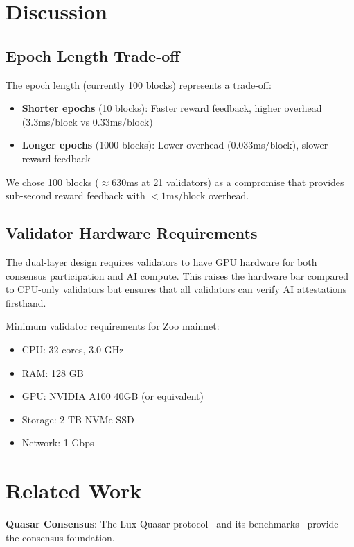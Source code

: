 \documentclass[11pt,letterpaper]{article}
\begin{document}
\section{Discussion}

\subsection{Epoch Length Trade-off}

The epoch length (currently 100 blocks) represents a trade-off:

\begin{itemize}
    \item \textbf{Shorter epochs} (10 blocks): Faster reward feedback, higher overhead (3.3ms/block vs 0.33ms/block)
    \item \textbf{Longer epochs} (1000 blocks): Lower overhead (0.033ms/block), slower reward feedback
\end{itemize}

We chose 100 blocks ($\approx$630ms at 21 validators) as a compromise that provides sub-second reward feedback with $< 1$ms/block overhead.

\subsection{Validator Hardware Requirements}

The dual-layer design requires validators to have GPU hardware for both consensus participation and AI compute. This raises the hardware bar compared to CPU-only validators but ensures that all validators can verify AI attestations firsthand.

Minimum validator requirements for Zoo mainnet:
\begin{itemize}
    \item CPU: 32 cores, 3.0 GHz
    \item RAM: 128 GB
    \item GPU: NVIDIA A100 40GB (or equivalent)
    \item Storage: 2 TB NVMe SSD
    \item Network: 1 Gbps
\end{itemize}

\section{Related Work}

\textbf{Quasar Consensus}: The Lux Quasar protocol~\cite{lux-quasar-consensus} and its benchmarks~\cite{lux-quasar-benchmarks} provide the consensus foundation.
\end{document}
